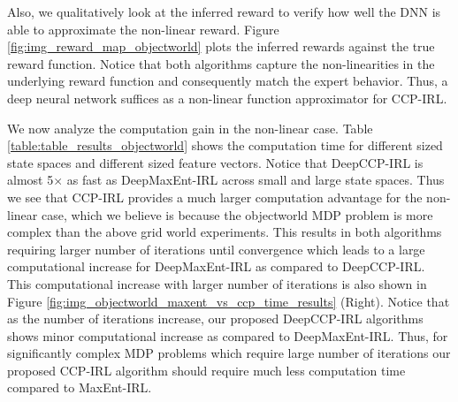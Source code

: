 \documentclass{article}
\begin{document}
Also, we qualitatively look at the inferred reward to verify how well the DNN is able to approximate the non-linear reward. Figure \ref{fig:img_reward_map_objectworld} plots the inferred rewards against the true reward function. Notice that both algorithms capture the non-linearities in the underlying reward function and consequently match the expert behavior. Thus, a deep neural network suffices as a non-linear function approximator for CCP-IRL. 

We now analyze the computation gain in the non-linear case. Table \ref{table:table_results_objectworld} shows the computation time for different sized state spaces and different sized feature vectors. Notice that DeepCCP-IRL is almost 5$\times$ as fast as DeepMaxEnt-IRL across small and large state spaces. Thus we see that CCP-IRL provides a much larger computation advantage for the non-linear case, which we believe is because the objectworld MDP problem is more complex than the above grid world experiments. 
This results in both algorithms requiring larger number of iterations until convergence which leads to a large computational increase for DeepMaxEnt-IRL as compared to DeepCCP-IRL. 
This computational increase with larger number of iterations is also shown in Figure \ref{fig:img_objectworld_maxent_vs_ccp_time_results} (Right).
Notice that as the number of iterations increase, our proposed DeepCCP-IRL algorithms shows minor computational increase as compared to DeepMaxEnt-IRL. 
Thus, for significantly complex MDP problems which require large number of iterations our proposed CCP-IRL algorithm should require much less computation time compared to MaxEnt-IRL.


\end{document}

